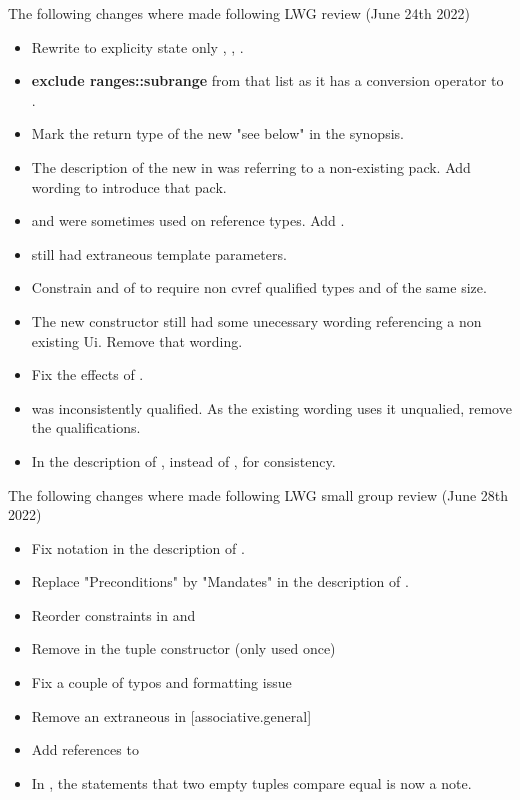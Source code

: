 \documentclass{wg21}
\begin{document}
The following changes where made following LWG review (June 24th 2022)

\begin{itemize}
\item Rewrite  to explicity state only , , .
\item \textbf{exclude ranges::subrange} from that list as it has a conversion operator to .
\item Mark the return type of the new  "see below" in the synopsis.
\item The description of the new  in  was referring to a non-existing pack. Add wording to introduce that pack.
\item {} and  were sometimes used on reference types. Add .
\item {} still had extraneous template parameters.
\item Constrain  and  of  to require
non cvref qualified types and  of the same size.
\item The new  constructor still had some unecessary wording referencing a non existing Ui.
Remove that wording.
\item Fix the effects of .
\item {} was inconsistently qualified. As the existing wording uses it unqualied,
remove the qualifications.
\item In the description of ,  instead of  ,
for consistency.
\end{itemize}

The following changes where made following LWG small group review (June 28th 2022)

\begin{itemize}
\item Fix notation in the description of .
\item Replace "Preconditions" by "Mandates" in the description of .
\item Reorder constraints in  and 
\item Remove  in the tuple constructor (only used once)
\item Fix a couple of typos and formatting issue
\item Remove an extraneous \tcode{>} in [associative.general]
\item Add references to 
\item In , the statements that two empty tuples compare equal is now a note.
\end{itemize}
\end{document}

